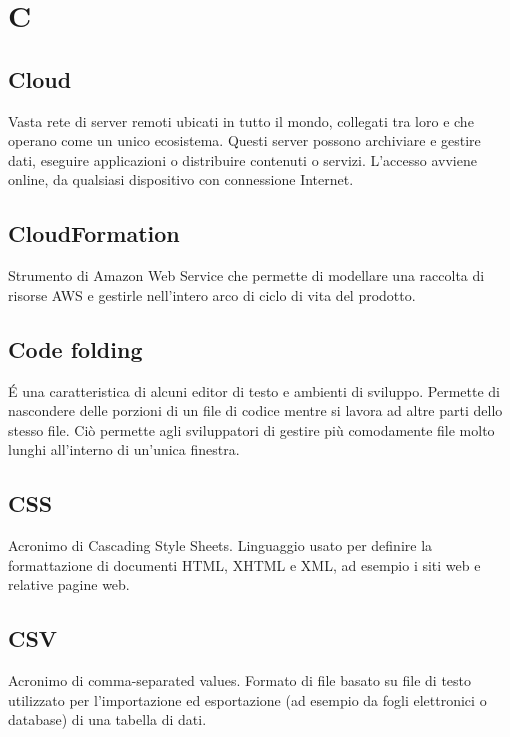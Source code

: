 \section*{C}
\markright{}
\subsection*{Cloud}
Vasta rete di server remoti ubicati in tutto il mondo, collegati tra loro e che operano come un unico ecosistema. Questi server possono archiviare e gestire dati, eseguire applicazioni o distribuire contenuti o servizi. L'accesso avviene online, da qualsiasi dispositivo con connessione Internet.
\subsection*{CloudFormation}
Strumento di Amazon Web Service che permette di modellare una raccolta di risorse AWS e gestirle nell'intero arco di ciclo di vita del prodotto.
\subsection*{Code folding}
\'E una caratteristica di alcuni editor di testo e ambienti di sviluppo. Permette di nascondere delle porzioni di un file di codice mentre si lavora ad altre parti dello stesso file. Ciò permette agli sviluppatori di gestire più comodamente file molto lunghi all'interno di un'unica finestra.
\subsection*{CSS}
Acronimo di Cascading Style Sheets. Linguaggio usato per definire la formattazione di documenti HTML, XHTML e XML, ad esempio i siti web e relative pagine web.
\subsection*{CSV}
Acronimo di comma-separated values. Formato di file basato su file di testo utilizzato per l'importazione ed esportazione (ad esempio da fogli elettronici o database) di una tabella di dati. 
